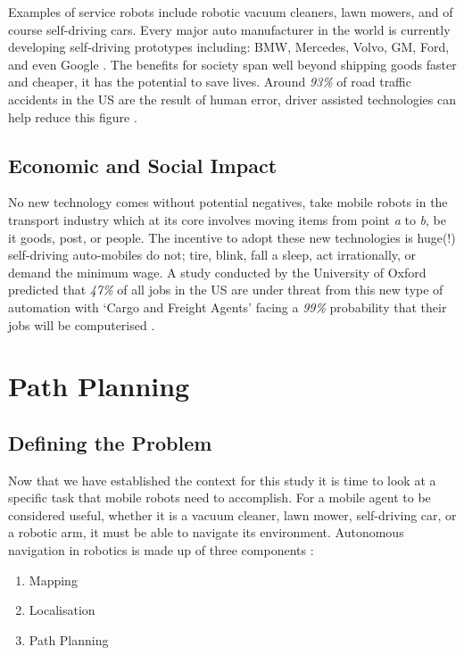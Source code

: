 \noindent
Examples of service robots include robotic vacuum cleaners, lawn mowers, and of course self-driving cars. Every major auto manufacturer in the world is currently developing self-driving prototypes including: BMW, Mercedes, Volvo, GM, Ford, and even Google \cite{MIT}. The benefits for society span well beyond shipping goods faster and cheaper, it has the potential to save lives. Around \textit{93\%} of road traffic accidents in the US are the result of human error, driver assisted technologies can help reduce this figure \cite{ROAD}.

\subsection{Economic and Social Impact}
\noindent
No new technology comes without potential negatives, take mobile robots in the transport industry which at its core involves moving items from point \textit{a} to \textit{b}, be it goods, post, or people. The incentive to adopt these new technologies is huge(!) self-driving auto-mobiles do not; tire, blink, fall a sleep, act irrationally, or demand the minimum wage. A study conducted by the University of Oxford predicted that \textit{47\%} of all jobs in the US are under threat from this new type of automation with `Cargo and Freight Agents' facing a \textit{99\%} probability that their jobs will be computerised \cite{OXFORD}. 


\section{Path Planning}

\subsection{Defining the Problem}
\noindent
Now that we have established the context for this study it is time to look at a specific task that mobile robots need to accomplish. For a mobile agent to be considered useful, whether it is a vacuum cleaner, lawn mower, self-driving car, or a robotic arm, it must be able to navigate its environment. Autonomous navigation in robotics is made up of three components \cite{NEH}:

\begin{enumerate}
\item Mapping
\item Localisation
\item Path Planning
\end{enumerate}

